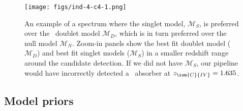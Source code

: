 \documentclass[fleqn,usenatbib]{mnras}
\newcommand{\civ}{\ion{C}{IV}}
\newcommand{\zciv}{z_{\civ}}
\newcommand{\Data}{\mathcal{D}}
\newcommand{\model}{\mathcal{M}}
\newcommand{\spb}[1]{\textcolor{red}{[\bf SPB: #1]}}
\begin{document}
\begin{figure}
  \centering
  \texttt{[image: figs/ind-4-c4-1.png]}
  \caption{An example of a spectrum where the singlet model, $\model_S$, is preferred over the \civ\ doublet model $\model_D$, which is in turn preferred over the null model $\model_N$. Zoom-in
   panels show the best fit doublet model ($\model_D$) and best fit singlet models ($\model_S$) in a smaller redshift range around the candidate detection.
   If we did not have $\model_S$, our pipeline
   would have incorrectly detected a \civ\ absorber at $\zciv = 1.635$. }
     \label{fig:sngl}
\end{figure}


\subsection{Model priors}
\label{sec:modelpriors}
\end{document}
